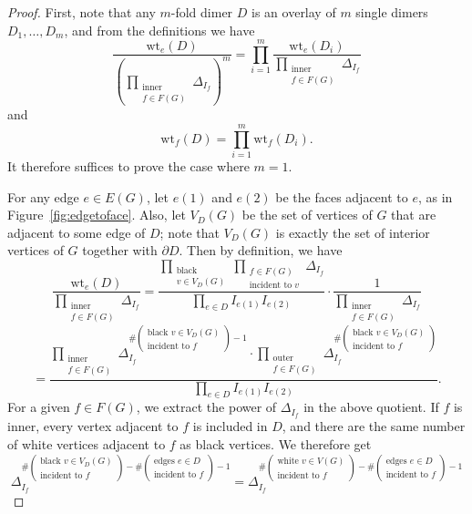 \begin{proof}
First, note that any $m$-fold dimer $D$ is an overlay of $m$ single dimers $D_1,\dots,D_m$, and from the definitions we have
\[\frac{\text{wt}_e(D)}{\left(\prod_{\substack{\text{inner }\\f \in F(G)}} \Delta_{I_f}\right)^m}=\prod_{i=1}^m \frac{\text{wt}_e(D_i)}{\prod_{\substack{\text{inner }\\f \in F(G)}} \Delta_{I_f}}\]
and
\[\text{wt}_f(D)=\prod_{i=1}^m \text{wt}_f(D_i).\]
It therefore suffices to prove the case where $m=1$.

For any edge $e \in E(G)$, let $e(1)$ and $e(2)$ be the faces adjacent to $e$, as in Figure~\ref{fig:edgetoface}. Also, let $V_D(G)$ be the set of vertices of $G$ that are adjacent to some edge of $D$; note that $V_D(G)$ is exactly the set of interior vertices of $G$ together with $\partial D$. Then by definition, we have
\[\frac{\text{wt}_e(D)}{\prod_{\substack{\text{inner }\\f \in F(G)}} \Delta_{I_f}}=\frac{\prod_{\substack{\text{black}\\v \in V_D(G)}}\prod_{\substack{\text{$f \in F(G)$}\\\text{incident to }v}} \Delta_{I_f}}{\prod_{e \in D}I_{e(1)}I_{e(2)}}\cdot \frac{1}{\prod_{\substack{\text{inner }\\f \in F(G)}} \Delta_{I_f}}\]
\[=\frac{\prod_{\substack{\text{inner }\\f \in F(G)}} \Delta_{I_f}^{\#\left(\substack{\text{black }v \in V_D(G)\\\text{incident to }f}\right)-1} \cdot\prod_{\substack{\text{outer }\\f \in F(G)}} \Delta_{I_f}^{\#\left(\substack{\text{black }v \in V_D(G)\\\text{incident to }f}\right)}}
{\prod_{e \in D} I_{e(1)}I_{e(2)}}.\]
For a given $f \in F(G)$, we extract the power of $\Delta_{I_f}$ in the above quotient. If $f$ is inner, every vertex adjacent to $f$ is included in $D$, and there are the same number of white vertices adjacent to $f$ as black vertices. We therefore get
\[\Delta_{I_f}^{\#\left(\substack{\text{black }v \in V_D(G)\\\text{incident to }f}\right)-\#\left(\substack{\text{edges }e \in D\\\text{incident to }f}\right)-1} =\Delta_{I_f}^{\#\left(\substack{\text{white }v \in V(G)\\\text{incident to }f}\right)-\#\left(\substack{\text{edges }e \in D\\\text{incident to }f}\right)-1}\]

\end{proof}
